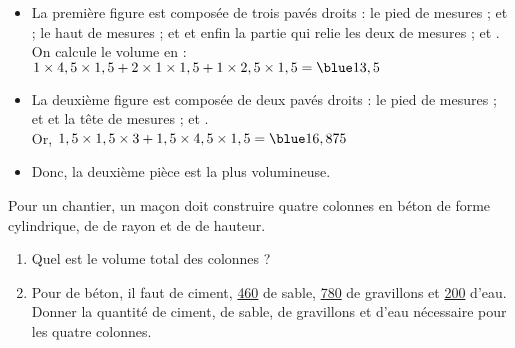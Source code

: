 \begin{colonne*exercice}
\begin{corrige}
   \begin{itemize}
      \item La première figure est composée de trois pavés droits : le \og pied \fg{} de mesures ;  et  ; le \og haut \fg{} de mesures ;  et  et enfin la partie qui relie les deux de mesures ;  et . \\
      On calcule le volume en \ucmc{} : \\
      $1\times4,5\times1,5+2\times1\times1,5+1\times2,5\times1,5 ={\blue 13,5}$
      \item La deuxième figure est composée de deux pavés droits : le pied de mesures ;  et  et la tête de mesures ;  et . \\
      Or, $1,5\times1,5\times3+1,5\times4,5\times1,5 ={\blue 16,875}$
      \item Donc, {\blue la deuxième pièce est la plus volumineuse}.
   \end{itemize}
\end{corrige}




\bigskip


\begin{exercice} %
   Pour un chantier, un maçon doit construire quatre colonnes en béton de forme cylindrique, de  de rayon et de  de hauteur.
   \begin{enumerate}
      \item Quel est le volume total des colonnes ?
      \item Pour  de béton, il faut  de ciment, \ul{460} de sable, \ul{780} de gravillons et \ul{200} d'eau. \\
         Donner la quantité de ciment, de sable, de gravillons et d'eau nécessaire pour les quatre colonnes.
   \end{enumerate}
\end{exercice}


\end{colonne*exercice}
